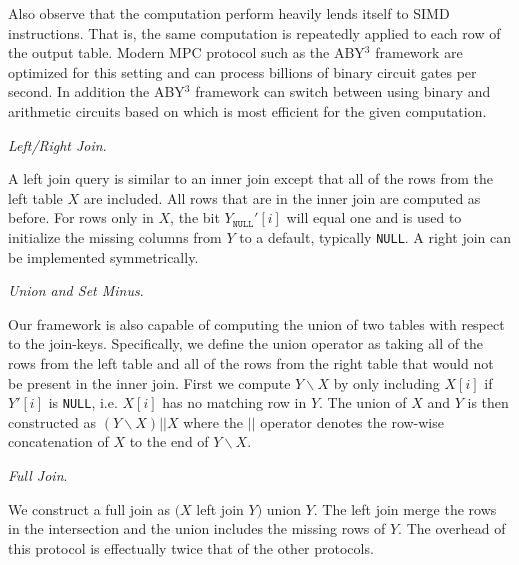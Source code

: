 \documentclass[11pt,letterpaper]{article}
\newcommand{\Null}{\texttt{NULL}\xspace}
\newcommand{\YNull}{\ensuremath{Y_\Null}\xspace}
\renewcommand{\paragraph}[1]{\vspace{0.1cm}\noindent\emph{#1}.} %
\providecommand{\DIFaddtex}[1]{{\protect\color{blue}\uwave{#1}}} %
\providecommand{\DIFaddbegin}{} %
\providecommand{\DIFaddend}{} %
\providecommand{\DIFdelbegin}{} %
\providecommand{\DIFdelend}{} %
\providecommand{\DIFadd}[1]{\texorpdfstring{\DIFaddtex{#1}}{#1}} %
\begin{document}
Also observe that the computation perform heavily lends itself to SIMD instructions. That is, the same computation is repeatedly applied to each row of the output table. Modern MPC protocol such as the ABY$^3$ framework \cite{aby3,highthroughput} are optimized for this setting and can process billions of binary circuit gates per second\cite{highthroughput}. In addition the ABY$^3$ framework can switch between using binary and arithmetic circuits based on which is most efficient for the given computation. 
\fi

\paragraph{Left/Right Join\DIFaddbegin \DIFadd{.}\DIFaddend }
\DIFdelbegin %

\DIFdelend A left join query is similar to an inner join except that all of the rows from the left table $X$ are included. All rows that are in the inner join are computed as before. For rows only in $X$, the bit $\YNull'[i]$ will equal one and is used to initialize the missing columns from $Y$ to a default, typically \texttt{NULL}. A right join can be implemented symmetrically.

\paragraph{Union and Set Minus\DIFaddbegin \DIFadd{.}\DIFaddend }
\DIFdelbegin %

\DIFdelend Our framework is also capable of computing the union of two tables with respect to the join-keys. Specifically, we define the union operator as taking all of the rows from the left table and all of the rows from the right table that would not be present in the inner join. First we compute $Y\backslash X$ by only including $X[i]$ if $Y'[i]$ is \Null, i.e. $X[i]$ has no matching row in $Y$. The union of $X$ and $Y$ is then constructed as $(Y\backslash X) || X$ where the $||$ operator denotes the row-wise concatenation of $X$ to the end of $Y\backslash X$.


\paragraph{Full Join\DIFaddbegin \DIFadd{.}\DIFaddend }
\DIFdelbegin %

\DIFdelend We construct a full join as $(X$ left join $Y)$ union $Y$. The left join merge the rows in the intersection and the union includes the missing rows of $Y$. The overhead of this protocol is effectually twice that of the other protocols. 
\end{document}
